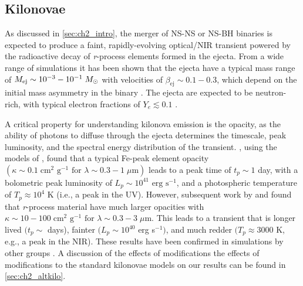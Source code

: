 \subsection{Kilonovae}
\label{sec:ch2_kilo}
As discussed in \cref{sec:ch2_intro}, the merger of NS-NS or NS-BH binaries is expected to produce a faint, rapidly-evolving optical/NIR transient powered by the radioactive decay of {\em r}-process elements formed in the ejecta. From a wide range of simulations it has been shown that the ejecta have a typical mass range of $M_{\rm ej} \sim 10^{-3}-10^{-1} \; M_{\odot}$ with velocities of $\beta_{\text{ej}} \sim 0.1-0.3$, which depend on the initial mass asymmetry in the binary \citep{Rosswog+99,Rosswog2005,Bauswein+13a,Rosswog+13}. The ejecta are expected to be neutron-rich, with typical electron fractions of $Y_e \lesssim 0.1$ \citep{Metzger+10}. 

A critical property for understanding kilonova emission is the opacity, as the ability of photons to diffuse through the ejecta determines the timescale, peak luminosity, and the spectral energy distribution of the transient. \citet{Metzger+10}, using the models of \citep[LP98 hereafter]{LP98}, found that a typical Fe-peak element opacity $(\kappa \sim 0.1 \; \text{cm}^2 \text{ g}^{-1} \text{ for } \lambda \sim 0.3 - 1\; \mu\text{m})$ leads to a peak time of $t_p \sim 1$ day, with a bolometric peak luminosity of $L_p \sim 10^{41} \text{ erg s}^{-1}$, and a photospheric temperature of $T_p \approx 10^4$ K (i.e., a peak in the UV). However, subsequent work by \citet{Kasen+13} and \citet{BarnesKasen13} found that {\em r}-process material have much larger opacities with $\kappa \sim 10-100 \; \text{cm}^2 \text{ g}^{-1} \text{ for } \lambda \sim 0.3 - 3\; \mu\text{m}$. This leads to a transient that is longer lived $(t_p \sim$ days), fainter $(L_p \sim 10^{40}$ erg s$^{-1})$, and much redder $(T_p \approx 3000$ K, e.g., a peak in the NIR). These results have been confirmed in simulations by other groups \citep[see e.g.,][]{TanakaHotokezaka13,Grossman+14,Tanaka+14}. A discussion of the effects of modifications the effects of modifications to the standard kilonovae models on our results can be found in \cref{sec:ch2_altkilo}.

